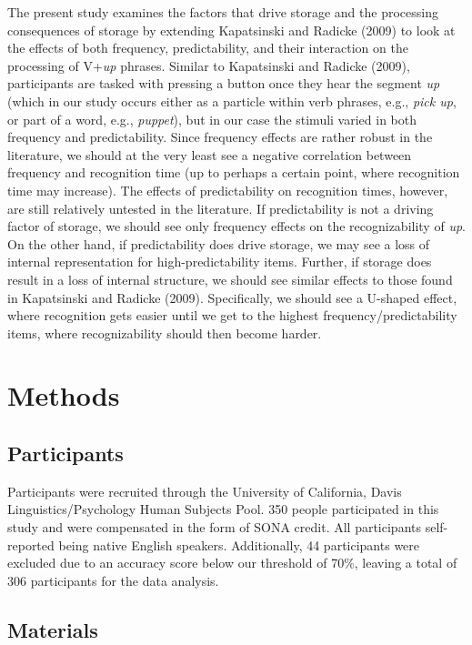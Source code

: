 \documentclass[
  man,floatsintext]{apa6}
\begin{document}
The present study examines the factors that drive storage and the processing consequences of storage by extending Kapatsinski and Radicke (2009) to look at the effects of both frequency, predictability, and their interaction on the processing of V+\emph{up} phrases. Similar to Kapatsinski and Radicke (2009), participants are tasked with pressing a button once they hear the segment \emph{up} (which in our study occurs either as a particle within verb phrases, e.g., \emph{pick up}, or part of a word, e.g., \emph{puppet}), but in our case the stimuli varied in both frequency and predictability. Since frequency effects are rather robust in the literature, we should at the very least see a negative correlation between frequency and recognition time (up to perhaps a certain point, where recognition time may increase). The effects of predictability on recognition times, however, are still relatively untested in the literature. If predictability is not a driving factor of storage, we should see only frequency effects on the recognizability of \emph{up}. On the other hand, if predictability does drive storage, we may see a loss of internal representation for high-predictability items. Further, if storage does result in a loss of internal structure, we should see similar effects to those found in Kapatsinski and Radicke (2009). Specifically, we should see a U-shaped effect, where recognition gets easier until we get to the highest frequency/predictability items, where recognizability should then become harder.

\hypertarget{methods}{%
\section{Methods}\label{methods}}

\hypertarget{participants}{%
\subsection{Participants}\label{participants}}

Participants were recruited through the University of California, Davis Linguistics/Psychology Human Subjects Pool. 350 people participated in this study and were compensated in the form of SONA credit. All participants self-reported being native English speakers. Additionally, 44 participants were excluded due to an accuracy score below our threshold of 70\%, leaving a total of 306 participants for the data analysis.

\hypertarget{materials}{%
\subsection{Materials}\label{materials}}
\end{document}
